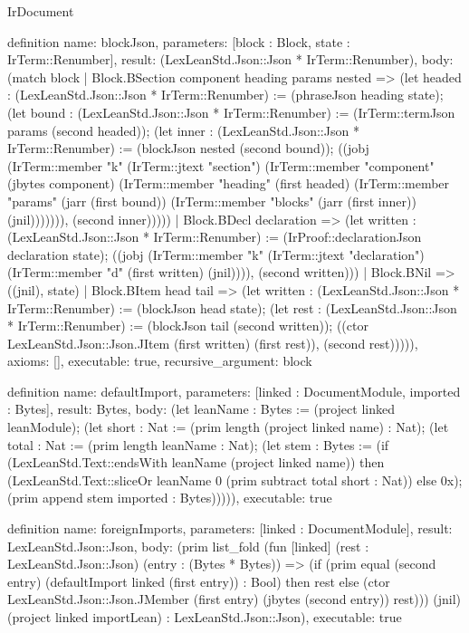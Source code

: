 \begin{lexlean}{IrDocument}
\begin{semanticmodule}
definition{
  name: blockJson,
  parameters: [block : Block, state : IrTerm::Renumber],
  result: (LexLeanStd.Json::Json * IrTerm::Renumber),
  body: (match block
    | Block.BSection component heading params nested => (let headed : (LexLeanStd.Json::Json * IrTerm::Renumber) := (phraseJson heading state); (let bound : (LexLeanStd.Json::Json * IrTerm::Renumber) := (IrTerm::termJson params (second headed)); (let inner : (LexLeanStd.Json::Json * IrTerm::Renumber) := (blockJson nested (second bound)); ((jobj (IrTerm::member "k" (IrTerm::jtext "section") (IrTerm::member "component" (jbytes component) (IrTerm::member "heading" (first headed) (IrTerm::member "params" (jarr (first bound)) (IrTerm::member "blocks" (jarr (first inner)) (jnil))))))), (second inner)))))
    | Block.BDecl declaration => (let written : (LexLeanStd.Json::Json * IrTerm::Renumber) := (IrProof::declarationJson declaration state); ((jobj (IrTerm::member "k" (IrTerm::jtext "declaration") (IrTerm::member "d" (first written) (jnil)))), (second written)))
    | Block.BNil => ((jnil), state)
    | Block.BItem head tail => (let written : (LexLeanStd.Json::Json * IrTerm::Renumber) := (blockJson head state); (let rest : (LexLeanStd.Json::Json * IrTerm::Renumber) := (blockJson tail (second written)); ((ctor LexLeanStd.Json::Json.JItem (first written) (first rest)), (second rest))))),
  axioms: [],
  executable: true,
  recursive_argument: block
}

definition{
  name: defaultImport,
  parameters: [linked : DocumentModule, imported : Bytes],
  result: Bytes,
  body: (let leanName : Bytes := (project linked leanModule); (let short : Nat := (prim length (project linked name) : Nat); (let total : Nat := (prim length leanName : Nat); (let stem : Bytes := (if (LexLeanStd.Text::endsWith leanName (project linked name)) then (LexLeanStd.Text::sliceOr leanName 0 (prim subtract total short : Nat)) else 0x); (prim append stem imported : Bytes))))),
  executable: true
}

definition{
  name: foreignImports,
  parameters: [linked : DocumentModule],
  result: LexLeanStd.Json::Json,
  body: (prim list_fold (fun [linked] (rest : LexLeanStd.Json::Json) (entry : (Bytes * Bytes)) => (if (prim equal (second entry) (defaultImport linked (first entry)) : Bool) then rest else (ctor LexLeanStd.Json::Json.JMember (first entry) (jbytes (second entry)) rest))) (jnil) (project linked importLean) : LexLeanStd.Json::Json),
  executable: true
}


\end{semanticmodule}
\end{lexlean}
